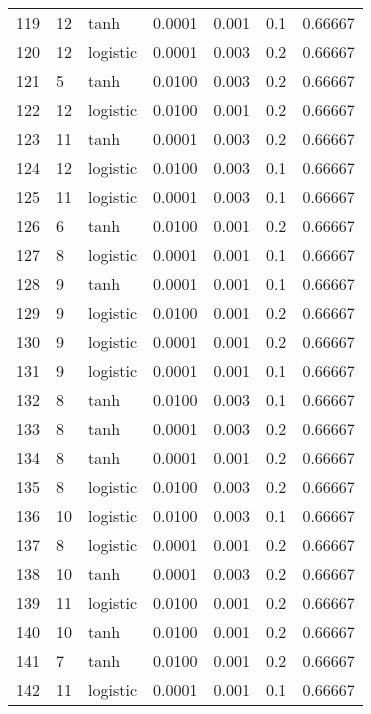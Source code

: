 \begin{tabular}{lllrrrr}
119 &          12 &      tanh &  0.0001 &  0.001 &  0.1 &   0.66667 \\
120 &          12 &  logistic &  0.0001 &  0.003 &  0.2 &   0.66667 \\
121 &           5 &      tanh &  0.0100 &  0.003 &  0.2 &   0.66667 \\
122 &          12 &  logistic &  0.0100 &  0.001 &  0.2 &   0.66667 \\
123 &          11 &      tanh &  0.0001 &  0.003 &  0.2 &   0.66667 \\
124 &          12 &  logistic &  0.0100 &  0.003 &  0.1 &   0.66667 \\
125 &          11 &  logistic &  0.0001 &  0.003 &  0.1 &   0.66667 \\
126 &           6 &      tanh &  0.0100 &  0.001 &  0.2 &   0.66667 \\
127 &           8 &  logistic &  0.0001 &  0.001 &  0.1 &   0.66667 \\
128 &           9 &      tanh &  0.0001 &  0.001 &  0.1 &   0.66667 \\
129 &           9 &  logistic &  0.0100 &  0.001 &  0.2 &   0.66667 \\
130 &           9 &  logistic &  0.0001 &  0.001 &  0.2 &   0.66667 \\
131 &           9 &  logistic &  0.0001 &  0.001 &  0.1 &   0.66667 \\
132 &           8 &      tanh &  0.0100 &  0.003 &  0.1 &   0.66667 \\
133 &           8 &      tanh &  0.0001 &  0.003 &  0.2 &   0.66667 \\
134 &           8 &      tanh &  0.0001 &  0.001 &  0.2 &   0.66667 \\
135 &           8 &  logistic &  0.0100 &  0.003 &  0.2 &   0.66667 \\
136 &          10 &  logistic &  0.0100 &  0.003 &  0.1 &   0.66667 \\
137 &           8 &  logistic &  0.0001 &  0.001 &  0.2 &   0.66667 \\
138 &          10 &      tanh &  0.0001 &  0.003 &  0.2 &   0.66667 \\
139 &          11 &  logistic &  0.0100 &  0.001 &  0.2 &   0.66667 \\
140 &          10 &      tanh &  0.0100 &  0.001 &  0.2 &   0.66667 \\
141 &           7 &      tanh &  0.0100 &  0.001 &  0.2 &   0.66667 \\
142 &          11 &  logistic &  0.0001 &  0.001 &  0.1 &   0.66667 \\

\end{tabular}
